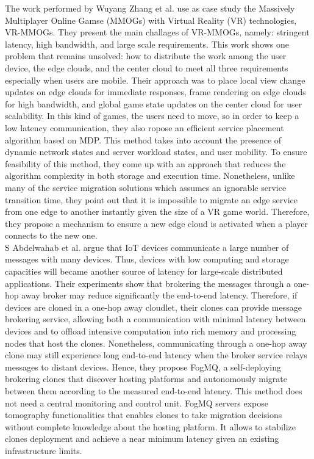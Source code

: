 \noindent\tab The work performed by Wuyang Zhang et al. \cite{Zhang2017} use as case study the Massively Multiplayer Online Gamse (MMOGs) with Virtual Reality (VR) technologies, VR-MMOGs. They present the main challages of VR-MMOGs, namely: stringent latency, high bandwidth, and large scale requirements. This work shows one problem that remains unsolved: how to distribute the work among the user device, the edge clouds, and the center cloud to meet all three requirements especially when users are mobile. Their approach was to place local view change updates on edge clouds for immediate responses, frame rendering on edge clouds for high bandwidth, and global game state updates on the center cloud for user scalability. In this kind of games, the users need to move, so in order to keep a low latency communication, they also ropose an efficient service placement algorithm based on MDP. This method takes into account the presence of dynamic network states and server workload states, and user mobility. To ensure feasibility of this method, they come up with an approach that reduces the algorithm complexity in both storage and execution time. Nonetheless, unlike many of the service migration solutions which assumes an ignorable service transition time, they point out that it is impossible to migrate an edge service from one edge to another instantly given the size of a VR game world. Therefore, they propose a mechanism to ensure a new edge cloud is activated when a player connects to the new one.\\
\noindent\tab S Abdelwahab et al. \cite{abdelwahab2018clones} argue that IoT devices communicate a large number of messages with many devices. Thus, devices with low computing and storage capacities will became another source of latency for large-scale distributed applications. Their experiments show that brokering the messages through a one-hop away broker may reduce significantly the end-to-end latency. Therefore, if devices are cloned in a one-hop away cloudlet, their clones can provide message brokering service, allowing both a communication with minimal latency between devices and to offload intensive computation into rich memory and processing nodes that host the clones. Nonetheless, communicating through a one-hop away clone may still experience long end-to-end latency when the broker service relays messages to distant devices. Hence, they propose FogMQ, a self-deploying brokering clones that discover hosting platforms and autonomously migrate between them according to the measured end-to-end latency. This method does not need a central monitoring and control unit. FogMQ servers expose tomography functionalities that enables clones to take migration decisions without complete knowledge about the hosting platform. It allows to stabilize clones deployment and achieve a near minimum latency given an existing infrastructure limits.\\
